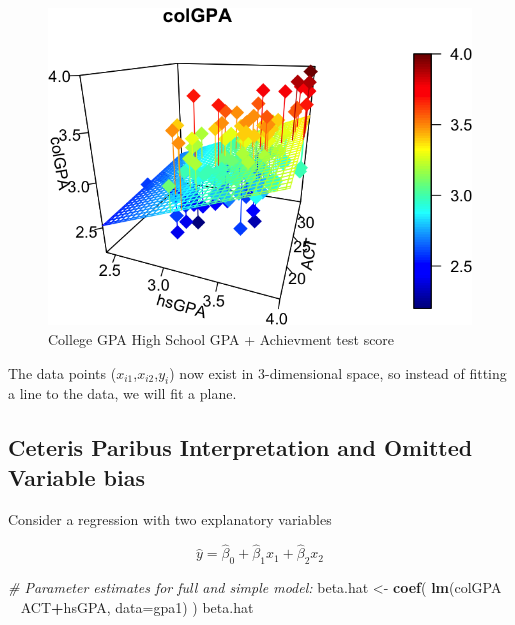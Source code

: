 \documentclass[]{book}
\newenvironment{Shaded}{\begin{snugshade}}{\end{snugshade}}
\newcommand{\CommentTok}[1]{\textcolor[rgb]{0.56,0.35,0.01}{\textit{#1}}}
\newcommand{\DataTypeTok}[1]{\textcolor[rgb]{0.13,0.29,0.53}{#1}}
\newcommand{\KeywordTok}[1]{\textcolor[rgb]{0.13,0.29,0.53}{\textbf{#1}}}
\newcommand{\NormalTok}[1]{#1}
\newcommand{\OperatorTok}[1]{\textcolor[rgb]{0.81,0.36,0.00}{\textbf{#1}}}
\newcommand{\StringTok}[1]{\textcolor[rgb]{0.31,0.60,0.02}{#1}}
\begin{document}
\begin{figure}

{\centering \includegraphics[width=0.8\linewidth]{MEM5220_R_files/figure-latex/fig16-1} 

}

\caption{College GPA  High School GPA + Achievment test score}\label{fig:fig16}
\end{figure}

The data points (\(x_{i1}\),\(x_{i2}\),\(y_{i}\)) now exist in
3-dimensional space, so instead of fitting a line to the data, we will
fit a plane.

\hypertarget{ceteris-paribus-interpretation-and-omitted-variable-bias}{%
\subsection{Ceteris Paribus Interpretation and Omitted Variable
bias}\label{ceteris-paribus-interpretation-and-omitted-variable-bias}}

Consider a regression with two explanatory variables

\begin{equation}
\hat{y} = \hat{\beta}_{0} + \hat{\beta}_{1}x_{1} +  \hat{\beta}_{2}x_{2}    
\label{eq:lmtwoexplanatory}
\end{equation}

\begin{Shaded}
\begin{Highlighting}[]
\CommentTok{# Parameter estimates for full and simple model:}
\NormalTok{beta.hat <-}\StringTok{ }\KeywordTok{coef}\NormalTok{( }\KeywordTok{lm}\NormalTok{(colGPA }\OperatorTok{~}\StringTok{ }\NormalTok{ACT}\OperatorTok{+}\NormalTok{hsGPA, }\DataTypeTok{data=}\NormalTok{gpa1) )}
\NormalTok{beta.hat}
\end{Highlighting}
\end{Shaded}
\end{document}
